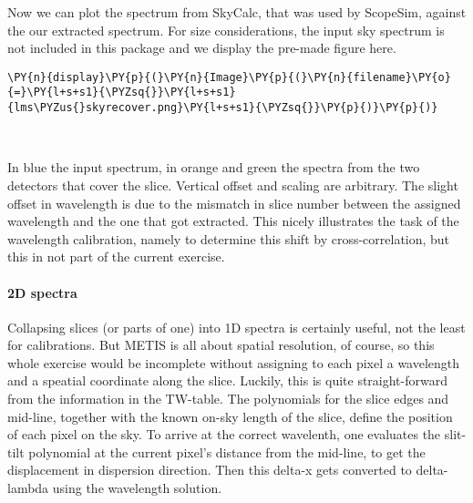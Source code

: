 Now we can plot the spectrum from SkyCalc, that was used by ScopeSim,
against the our extracted spectrum. For size considerations, the input
sky spectrum is not included in this package and we display the pre-made
figure here.

    \begin{tcolorbox}[breakable, size=fbox, boxrule=1pt, pad at break*=1mm,colback=cellbackground, colframe=cellborder]
\begin{Verbatim}[commandchars=\\\{\}]
\PY{n}{display}\PY{p}{(}\PY{n}{Image}\PY{p}{(}\PY{n}{filename}\PY{o}{=}\PY{l+s+s1}{\PYZsq{}}\PY{l+s+s1}{lms\PYZus{}skyrecover.png}\PY{l+s+s1}{\PYZsq{}}\PY{p}{)}\PY{p}{)}
\end{Verbatim}
\end{tcolorbox}

    \begin{center}
    \end{center}
    { \hspace*{\fill} \\}

In blue the input spectrum, in orange and green the spectra from the two
detectors that cover the slice. Vertical offset and scaling are
arbitrary. The slight offset in wavelength is due to the mismatch in
slice number between the assigned wavelength and the one that got
extracted. This nicely illustrates the task of the wavelength
calibration, namely to determine this shift by cross-correlation, but
this in not part of the current exercise.

\paragraph{2D spectra}
Collapsing slices (or parts of one) into 1D spectra is certainly useful,
not the least for calibrations. But METIS is all about spatial
resolution, of course, so this whole exercise would be incomplete
without assigning to each pixel a wavelength and a speatial coordinate
along the slice. Luckily, this is quite straight-forward from the
information in the TW-table. The polynomials for the slice edges and
mid-line, together with the known on-sky length of the slice, define the
position of each pixel on the sky. To arrive at the correct wavelenth,
one evaluates the slit-tilt polynomial at the current pixel's distance
from the mid-line, to get the displacement in dispersion direction. Then
this delta-x gets converted to delta-lambda using the wavelength
solution.

